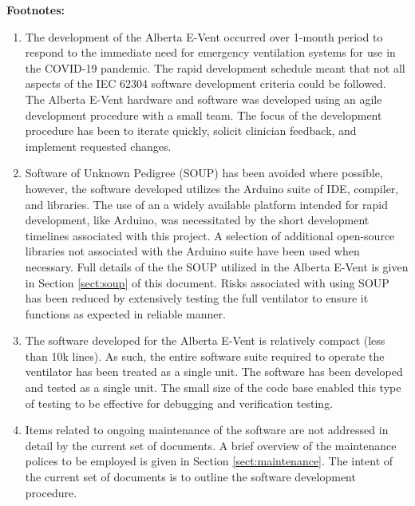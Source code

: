 \documentclass[]{article}
\begin{document}
\begin{center}
\begin{longtable}{ |p{1.3cm}| p{5.5cm}| p{0.7cm}| p{0.7cm}| p{0.7cm}| p{3.5cm}| }
	
\end{longtable}
\end{center}

\noindent \textbf{Footnotes:}
\begin{enumerate}
	\item The development of the Alberta E-Vent occurred over 1-month period to respond to the immediate need for emergency ventilation systems for use in the COVID-19 pandemic.  The rapid development schedule meant that not all aspects of the IEC 62304 software development criteria could be followed.  The Alberta E-Vent hardware and software was developed using an agile development procedure with a small team.  The focus of the development procedure has been to iterate quickly, solicit clinician feedback, and implement requested changes.
	\item Software of Unknown Pedigree (SOUP) has been avoided where possible, however, the software developed utilizes the Arduino suite of IDE, compiler, and libraries.  The use of an a widely available platform intended for rapid development, like Arduino, was necessitated by the short development timelines associated with this project.  A selection of additional open-source libraries not associated with the Arduino suite have been used when necessary.  Full details of the the SOUP utilized in the Alberta E-Vent is given in Section \ref{sect:soup} of this document.  Risks associated with using SOUP has been reduced by extensively testing the full ventilator to ensure it functions as expected in reliable manner.
	\item The software developed for the Alberta E-Vent is relatively compact (less than 10k lines). As such, the entire  software suite required to operate the ventilator has been treated as a single unit.  The software has been developed and tested as a single unit. The small size of the code base enabled this type of testing to be effective for debugging and verification testing.
	\item Items related to ongoing maintenance of the software are not addressed in detail by the current set of documents.  A brief overview of the maintenance polices to be employed is given in Section \ref{sect:maintenance}. The intent of the current set of documents is to outline the software development procedure.
	
\end{enumerate}



\clearpage
\end{document}
